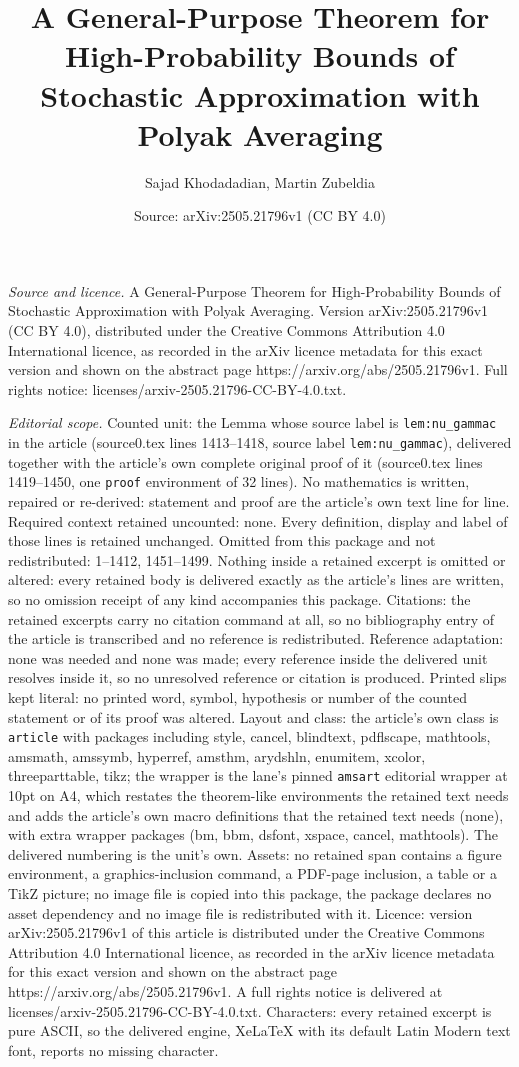 \documentclass[10pt,a4paper]{amsart}
\title[A General-Purpose Theorem for High-Probability Bounds of Sto]{A General-Purpose Theorem for High-Probability Bounds of Stochastic Approximation with Polyak Averaging}
\author{Sajad Khodadadian, Martin Zubeldia}
\date{Source: arXiv:2505.21796v1 (CC BY 4.0)}
\begin{document}
\maketitle

\noindent\emph{Source and licence.} A General-Purpose Theorem for High-Probability Bounds of Stochastic Approximation with Polyak Averaging. Version arXiv:2505.21796v1 (CC BY 4.0), distributed under the Creative Commons Attribution 4.0 International licence, as recorded in the arXiv licence metadata for this exact version and shown on the abstract page https://arxiv.org/abs/2505.21796v1. Full rights notice: licenses/arxiv-2505.21796-CC-BY-4.0.txt.\par\smallskip

\noindent\textit{Editorial scope.} Counted unit: the Lemma whose source label is \texttt{lem:nu\_gammac} in the article (source0.tex lines 1413--1418, source label \texttt{lem:nu\_gammac}), delivered together with the article's own complete original proof of it (source0.tex lines 1419--1450, one \texttt{proof} environment of 32 lines). No mathematics is written, repaired or re-derived: statement and proof are the article's own text line for line. Required context retained uncounted: none. Every definition, display and label of those lines is retained unchanged. Omitted from this package and not redistributed: 1--1412, 1451--1499. Nothing inside a retained excerpt is omitted or altered: every retained body is delivered exactly as the article's lines are written, so no omission receipt of any kind accompanies this package. Citations: the retained excerpts carry no citation command at all, so no bibliography entry of the article is transcribed and no reference is redistributed. Reference adaptation: none was needed and none was made; every reference inside the delivered unit resolves inside it, so no unresolved reference or citation is produced. Printed slips kept literal: no printed word, symbol, hypothesis or number of the counted statement or of its proof was altered. Layout and class: the article's own class is \texttt{article} with packages including style, cancel, blindtext, pdflscape, mathtools, amsmath, amssymb, hyperref, amsthm, arydshln, enumitem, xcolor, threeparttable, tikz; the wrapper is the lane's pinned \texttt{amsart} editorial wrapper at 10pt on A4, which restates the theorem-like environments the retained text needs and adds the article's own macro definitions that the retained text needs (none), with extra wrapper packages (bm, bbm, dsfont, xspace, cancel, mathtools). The delivered numbering is the unit's own. Assets: no retained span contains a figure environment, a graphics-inclusion command, a PDF-page inclusion, a table or a TikZ picture; no image file is copied into this package, the package declares no asset dependency and no image file is redistributed with it. Licence: version arXiv:2505.21796v1 of this article is distributed under the Creative Commons Attribution 4.0 International licence, as recorded in the arXiv licence metadata for this exact version and shown on the abstract page https://arxiv.org/abs/2505.21796v1. A full rights notice is delivered at licenses/arxiv-2505.21796-CC-BY-4.0.txt. Characters: every retained excerpt is pure ASCII, so the delivered engine, XeLaTeX with its default Latin Modern text font, reports no missing character.
\end{document}
